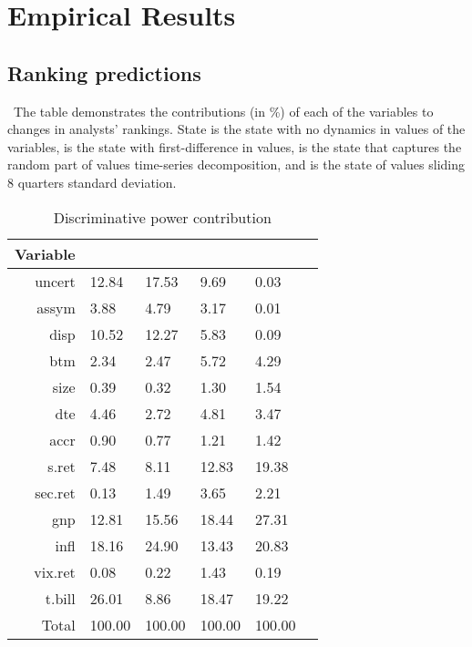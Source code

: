 \documentclass[a4paper,twoside,12pt,openright,notitlepage]{report}\usepackage[]{graphicx}\usepackage[]{color}
\begin{document}


\section{Empirical Results}
\label{ch4-sec:results}

\subsection{Ranking predictions}

\begin{table}
\caption{Discriminative power contribution}
\ The table demonstrates the contributions (in \%) of each of the variables to changes in analysts' rankings. State \last{} is the state with no dynamics in values of the variables, \diff{} is the state with first-difference in values, \random{} is the state that captures the random part of values time-series decomposition,  and \rollsd{} is the state of values sliding 8 quarters standard deviation.

\begin{tabu} to 
\toprule
Variable&\last{}&\diff{}&\random{}&\rollsd{} \\
\midrule

 uncert & 12.84 & 17.53 & 9.69 & 0.03 \\ 
  assym & 3.88 & 4.79 & 3.17 & 0.01 \\ 
  disp & 10.52 & 12.27 & 5.83 & 0.09 \\ 
  btm & 2.34 & 2.47 & 5.72 & 4.29 \\ 
  size & 0.39 & 0.32 & 1.30 & 1.54 \\ 
  dte & 4.46 & 2.72 & 4.81 & 3.47 \\ 
  accr & 0.90 & 0.77 & 1.21 & 1.42 \\ 
  s.ret & 7.48 & 8.11 & 12.83 & 19.38 \\ 
  sec.ret & 0.13 & 1.49 & 3.65 & 2.21 \\ 
  gnp & 12.81 & 15.56 & 18.44 & 27.31 \\ 
  infl & 18.16 & 24.90 & 13.43 & 20.83 \\ 
  vix.ret & 0.08 & 0.22 & 1.43 & 0.19 \\ 
  t.bill & 26.01 & 8.86 & 18.47 & 19.22 \\ 
   \midrule 
Total & 100.00 & 100.00 & 100.00 & 100.00 \\ 
  

\bottomrule
\end{tabu}
\label{ch4:tab-dp}
\end{table}
\end{document}
